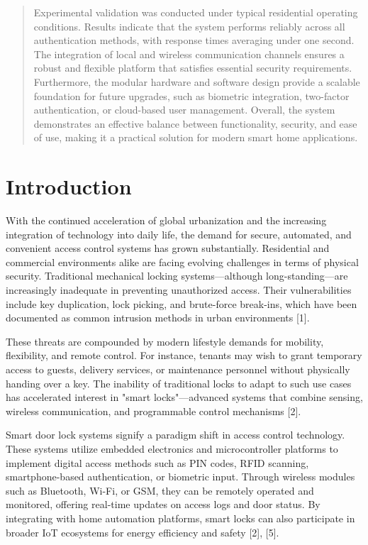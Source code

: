 \documentclass[conference, onecolumn]{IEEEtran}
\begin{document}
\begin{abstract}
Experimental validation was conducted under typical residential operating conditions. Results indicate that the system performs reliably across all authentication methods, with response times averaging under one second. The integration of local and wireless communication channels ensures a robust and flexible platform that satisfies essential security requirements. Furthermore, the modular hardware and software design provide a scalable foundation for future upgrades, such as biometric integration, two-factor authentication, or cloud-based user management. Overall, the system demonstrates an effective balance between functionality, security, and ease of use, making it a practical solution for modern smart home applications.
\end{abstract}

\section{Introduction}
With the continued acceleration of global urbanization and the increasing integration of technology into daily life, the demand for secure, automated, and convenient access control systems has grown substantially. Residential and commercial environments alike are facing evolving challenges in terms of physical security. Traditional mechanical locking systems—although long-standing—are increasingly inadequate in preventing unauthorized access. Their vulnerabilities include key duplication, lock picking, and brute-force break-ins, which have been documented as common intrusion methods in urban environments [1].

These threats are compounded by modern lifestyle demands for mobility, flexibility, and remote control. For instance, tenants may wish to grant temporary access to guests, delivery services, or maintenance personnel without physically handing over a key. The inability of traditional locks to adapt to such use cases has accelerated interest in "smart locks"—advanced systems that combine sensing, wireless communication, and programmable control mechanisms [2].

Smart door lock systems signify a paradigm shift in access control technology. These systems utilize embedded electronics and microcontroller platforms to implement digital access methods such as PIN codes, RFID scanning, smartphone-based authentication, or biometric input. Through wireless modules such as Bluetooth, Wi-Fi, or GSM, they can be remotely operated and monitored, offering real-time updates on access logs and door status. By integrating with home automation platforms, smart locks can also participate in broader IoT ecosystems for energy efficiency and safety [2], [5].
\end{document}
